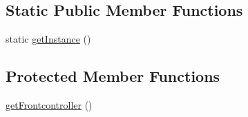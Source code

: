 \subsection*{Static Public Member Functions}
\begin{DoxyCompactItemize}
\item 
static \hyperlink{class_anemo_1_1_layout_1_1_layout_abstract_ac93fbec81f07e5d15f80db907e63dc10}{getInstance} ()
\end{DoxyCompactItemize}
\subsection*{Protected Member Functions}
\begin{DoxyCompactItemize}
\item 
\hyperlink{class_anemo_1_1_layout_1_1_layout_abstract_aa182525e446da02ad9af5d903f3f8f66}{getFrontcontroller} ()
\end{DoxyCompactItemize}
